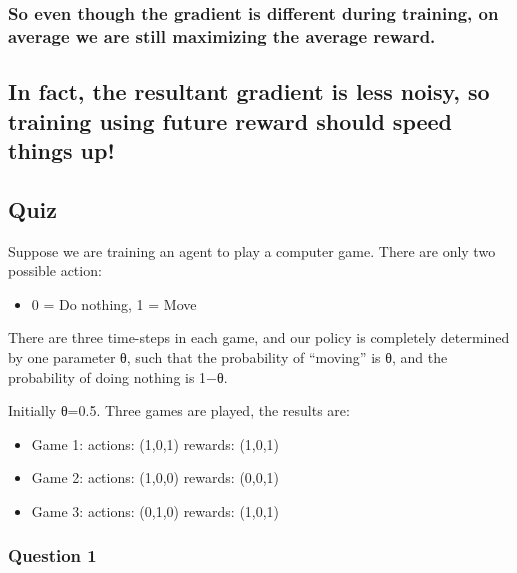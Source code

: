 \documentclass[11pt]{article}
\providecommand{\tightlist}{%
      \setlength{\itemsep}{0pt}\setlength{\parskip}{0pt}}
\begin{document}
\hypertarget{so-even-though-the-gradient-is-different-during-training-on-average-we-are-still-maximizing-the-average-reward.}{%
\subsubsection{So even though the gradient is different during training,
on average we are still maximizing the average
reward.}\label{so-even-though-the-gradient-is-different-during-training-on-average-we-are-still-maximizing-the-average-reward.}}

\hypertarget{in-fact-the-resultant-gradient-is-less-noisy-so-training-using-future-reward-should-speed-things-up}{%
\subsection{In fact, the resultant gradient is less noisy, so training
using future reward should speed things
up!}\label{in-fact-the-resultant-gradient-is-less-noisy-so-training-using-future-reward-should-speed-things-up}}

    \hypertarget{quiz}{%
\subsection{Quiz}\label{quiz}}

Suppose we are training an agent to play a computer game. There are only
two possible action:

\begin{itemize}
\tightlist
\item
  0 = Do nothing, 1 = Move
\end{itemize}

There are three time-steps in each game, and our policy is completely
determined by one parameter θ, such that the probability of ``moving''
is θ, and the probability of doing nothing is 1−θ.

Initially θ=0.5. Three games are played, the results are:

\begin{itemize}
\tightlist
\item
  Game 1: actions: (1,0,1) rewards: (1,0,1)
\item
  Game 2: actions: (1,0,0) rewards: (0,0,1)
\item
  Game 3: actions: (0,1,0) rewards: (1,0,1)
\end{itemize}

    \hypertarget{question-1}{%
\subsubsection{Question 1}\label{question-1}}
\end{document}
